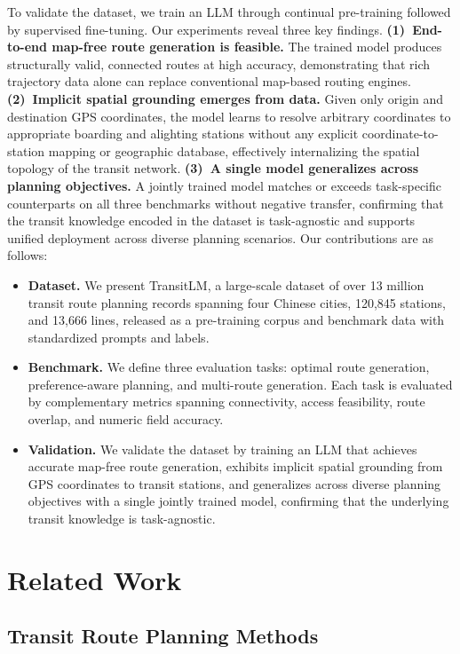 \documentclass{article}
\begin{document}
To validate the dataset, we train an LLM through continual pre-training followed by supervised fine-tuning. Our experiments reveal three key findings.
\textbf{(1)~End-to-end map-free route generation is feasible.} The trained model produces structurally valid, connected routes at high accuracy, demonstrating that rich trajectory data alone can replace conventional map-based routing engines.
\textbf{(2)~Implicit spatial grounding emerges from data.} Given only origin and destination GPS coordinates, the model learns to resolve arbitrary coordinates to appropriate boarding and alighting stations without any explicit coordinate-to-station mapping or geographic database, effectively internalizing the spatial topology of the transit network.
\textbf{(3)~A single model generalizes across planning objectives.} A jointly trained model matches or exceeds task-specific counterparts on all three benchmarks without negative transfer, confirming that the transit knowledge encoded in the dataset is task-agnostic and supports unified deployment across diverse planning scenarios.
Our contributions are as follows:
\begin{itemize}[left=0pt]
\item \textbf{Dataset.} We present TransitLM, a large-scale dataset of over 13 million transit route planning records spanning four Chinese cities, 120,845 stations, and 13,666 lines, released as a pre-training corpus and benchmark data with standardized prompts and labels.
\item \textbf{Benchmark.} We define three evaluation tasks: optimal route generation, preference-aware planning, and multi-route generation. Each task is evaluated by complementary metrics spanning connectivity, access feasibility, route overlap, and numeric field accuracy.
\item \textbf{Validation.} We validate the dataset by training an LLM that achieves accurate map-free route generation, exhibits implicit spatial grounding from GPS coordinates to transit stations, and generalizes across diverse planning objectives with a single jointly trained model, confirming that the underlying transit knowledge is task-agnostic.
\end{itemize}

\section{Related Work}

\subsection{Transit Route Planning Methods}
\end{document}
